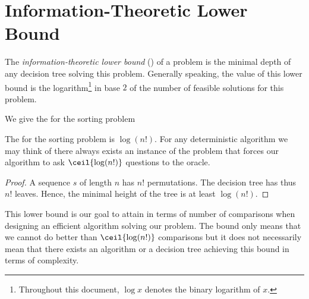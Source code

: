 \section{Information-Theoretic Lower Bound}
\label{tree:sorting:ITLB}

The \emph{information-theoretic lower bound} (\ITLB) of a problem
is the minimal depth of any
decision tree solving this problem. Generally speaking, the value of this lower
bound is the logarithm\footnote{Throughout this document, \(\log x\) denotes the binary logarithm of \(x\).}
in base \(2\) of the number of feasible solutions for this problem.

We give the \ITLB for the sorting problem
\begin{theorem}
The \ITLB for the sorting problem is
\(\log(n!)\). For any deterministic algorithm we may think of
there always exists an instance of the problem that forces our
algorithm to ask \(\ceil{\log(n!)}\) questions to the oracle.
\end{theorem}
\begin{proof}
A sequence \(s\) of length \(n\) has \(n!\) permutations. The decision tree has thus
\(n!\) leaves. Hence, the minimal height of the tree is at least \(\log(n!)\).
\end{proof}

This lower bound is our goal to attain in terms of number of comparisons
when designing an efficient algorithm solving our problem. The bound only means
that we cannot do better than \(\ceil{\log(n!)}\) comparisons but it does not
necessarily mean that there exists an algorithm or a decision tree achieving
this bound in terms of complexity.
